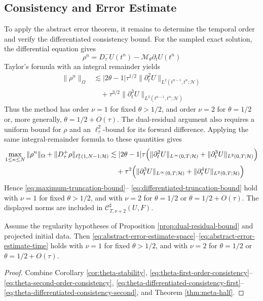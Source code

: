 \documentclass[11pt]{article}
\begin{document}
\subsection{Consistency and Error Estimate}
\label{subsec:theta-consistency-error}
To apply the abstract error theorem, it remains to determine the temporal order
and verify the differentiated consistency bound. For the sampled exact
solution, the differential equation gives
\begin{equation}
\rho^n=D_{\tau}^{-}U(t^n)
-\mathcal M_{\theta}\partial_tU(t^n) \label{eq:theta-truncation-residual}
\end{equation}
Taylor's formula with an integral remainder yields
\begin{align}
\|\rho^n\|_{\Omega}
&\lesssim |2\theta-1|\tau^{1/2}
\|\partial_t^2U\|_{L^2(t^{n-1},t^n;\mathcal H)} \label{eq:theta-first-order-consistency}\\
&\quad+\tau^{3/2}
\|\partial_t^3U\|_{L^2(t^{n-1},t^n;\mathcal H)} \label{eq:theta-second-order-consistency}
\end{align}
Thus the method has order \(\nu=1\) for fixed \(\theta>1/2\), and order
\(\nu=2\) for \(\theta=1/2\) or, more generally,
\(\theta=1/2+O(\tau)\). The dual-residual argument also requires a uniform
bound for \(\rho\) and an \(\ell_{\tau}^2\)-bound for its forward difference.
Applying the same integral-remainder formula to these quantities gives
\begin{align}
\max_{1\le n\le N}\|\rho^n\|_{\Omega}
+\|D_{\tau}^{+}\rho\|_{\ell_{\tau}^2(1,N-1;\mathcal H)}
&\lesssim |2\theta-1|\tau\Bigl(
\|\partial_t^2U\|_{L^{\infty}(0,T;\mathcal H)}
+\|\partial_t^3U\|_{L^2(0,T;\mathcal H)}\Bigr)
\label{eq:theta-differentiated-consistency-first}\\
&\quad+\tau^2\Bigl(
\|\partial_t^3U\|_{L^{\infty}(0,T;\mathcal H)}
+\|\partial_t^4U\|_{L^2(0,T;\mathcal H)}\Bigr)
\label{eq:theta-differentiated-consistency-second}
\end{align}
Hence \eqref{eq:maximum-truncation-bound}--
\eqref{eq:differentiated-truncation-bound} hold with \(\nu=1\) for fixed
\(\theta>1/2\), and with \(\nu=2\) for \(\theta=1/2\) or
\(\theta=1/2+O(\tau)\). The displayed norms are included in
\(\mathcal C^{\sharp}_{T,\nu+2}(U,F)\).

\begin{cor}
\label{cor:theta-error}
Assume the regularity hypotheses of Proposition
\ref{prop:dual-residual-bound} and projected initial data. Then
\eqref{eq:abstract-error-estimate-space}--\eqref{eq:abstract-error-estimate-time}
holds with \(\nu=1\) for fixed \(\theta>1/2\), and with \(\nu=2\) for
\(\theta=1/2\) or \(\theta=1/2+O(\tau)\).
\end{cor}
\begin{proof}
Combine Corollary \ref{cor:theta-stability},
\eqref{eq:theta-first-order-consistency}--\eqref{eq:theta-second-order-consistency},
\eqref{eq:theta-differentiated-consistency-first}--
\eqref{eq:theta-differentiated-consistency-second},
and Theorem \ref{thm:meta-half}.
\end{proof}
\end{document}
